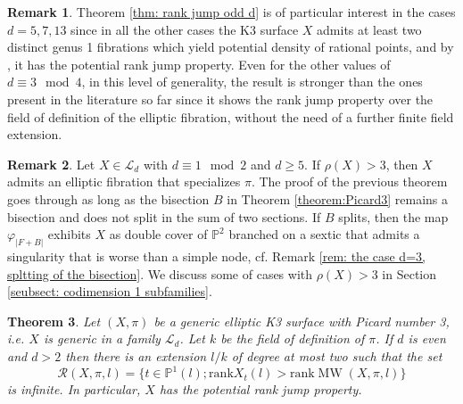 \documentclass{amsart}
\newtheorem{theorem}{Theorem}[section]
\theoremstyle{definition}
\newtheorem{remark}[theorem]{Remark}
\numberwithin{equation}{section}
\DeclareMathOperator{\MW}{MW}
\begin{document}
\begin{remark}
Theorem \ref{thm: rank jump odd d} is of particular interest in the cases $d=5,7,13$ since in all the other cases the K3 surface $X$ admits at least two distinct genus 1 fibrations which yield potential density of rational points, and by \cite[Theorem 1.1]{PastenSalgado}, it has the potential rank jump property. Even for the other values of $d\equiv 3\mod 4$,  in this level of generality, the result is stronger than the ones present in the literature so far since it shows the rank jump property over the field of definition of the elliptic fibration, without the need of a further finite field extension.
\end{remark}
\begin{remark}\label{rem: non splitting of the bisection}
Let $X\in\mathcal{L}_{d}$ with $d\equiv 1 \mod 2$ and $d\geq 5$. If $\rho(X)>3$, then $X$  admits an elliptic fibration that specializes $\pi$. The proof of the previous theorem goes through as long as the bisection $B$ in Theorem \ref{theorem:Picard3} remains a bisection and does not split in the sum of two sections. If $B$ splits, then the map $\varphi_{|F+B|}$ exhibits $X$ as double cover of $\mathbb{P}^2$ branched on a sextic that admits a singularity that is worse than a simple node, cf. Remark \ref{rem: the case d=3, spltting of the bisection}. We discuss some of cases with $\rho(X)>3$ in Section \ref{seubsect: codimension 1 subfamilies}.
\end{remark}



\begin{theorem}\label{thm: rank jump_even}
Let $(X, \pi)$ be a generic elliptic K3 surface with Picard number 3, i.e. $X$ is generic in a family $\mathcal{L}_d$.  Let $k$ be the field of definition of $\pi$. If $d$ is even and $d>2$ then there is an extension $l/k$ of degree at most two such that the set 
\[
\mathcal{R}(X,\pi, l)=\{t\in \mathbb{P}^1(l); \mathrm{rank} X_t(l)>\mathrm{rank} \MW(X,\pi,l)\}
\] is infinite. 
In particular,   $X$ has the potential rank jump property.
\end{theorem}
\end{document}
